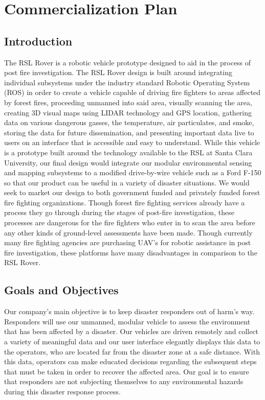 \chapter{Commercialization Plan}

\section{Introduction}

The RSL Rover is a robotic vehicle prototype designed to aid in the process of post fire investigation. The RSL Rover design is built around integrating individual subsystems under the industry standard Robotic Operating System (ROS) in order to create a vehicle capable of driving fire fighters to areas affected by forest fires, proceeding unmanned into said area, visually scanning the area, creating 3D visual maps using LIDAR technology and GPS location, gathering data on various dangerous gasses, the temperature, air particulates, and smoke, storing the data for future dissemination, and presenting important data live to users on an interface that is accessible and easy to understand. While this vehicle is a prototype built around the technology available to the RSL at Santa Clara University, our final design would integrate our modular environmental sensing and mapping subsystems to a modified drive-by-wire vehicle such as a Ford F-150 so that our product can be useful in a variety of disaster situations. We would seek to market our design to both government funded and privately funded forest fire fighting organizations. Though forest fire fighting services already have a process they go through during the stages of post-fire investigation, these processes are dangerous for the fire fighters who enter in to scan the area before any other kinds of ground-level assessments have been made. Though currently many fire fighting agencies are purchasing UAV's for robotic assistance in post fire investigation, these platforms have many disadvantages in comparison to the RSL Rover.

\section{Goals and Objectives}

Our company's main objective is to keep disaster responders out of harm's way. Responders will use our unmanned, modular vehicle to assess the environment that has been affected by a disaster. Our vehicles are driven remotely and collect a variety of meaningful data and our user interface elegantly displays this data to the operators, who are located far from the disaster zone at a safe distance. With this data, operators can make educated decisions regarding the subsequent steps that must be taken in order to recover the affected area. Our goal is to ensure that responders are not subjecting themselves to any environmental hazards during this disaster response process. 

